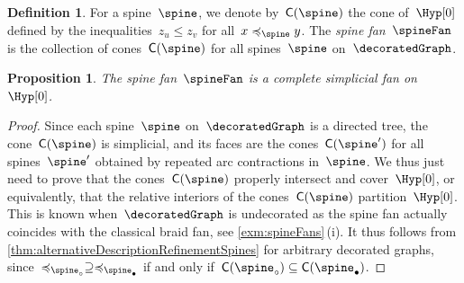 \documentclass{amsart}
\newtheorem{proposition}[theorem]{Proposition}
\theoremstyle{definition}
\newtheorem{definition}[theorem]{Definition}
\newtheorem{example}[theorem]{Example}
\newcommand{\R}{\mathbb{R}} %
\renewcommand{\b}[1]{{\boldsymbol{#1}}} %
\newcommand{\set}[2]{\left\{ #1 \;\middle|\; #2 \right\}} %
\newcommand{\darkblue}{\color{darkblue}} %
\newcommand{\defn}[1]{\textsl{\darkblue #1}} %
\newcommand{\vincent}[1]{\todo[color=blue!30]{#1 \\ \hfill --- V.}}
\newcommand{\normalCone}{\mathsf{C}} %
\begin{document}
%
%

\begin{definition}
  \label{def:spineFan}
  For a spine~$\spine$, we denote by~$\normalCone(\spine)$ the cone of~$\Hyp[0]$ defined by the inequalities~${z_u \le z_v}$ for all~$x \preccurlyeq_{\spine} y$.
  The \defn{spine fan}~$\spineFan$ is the collection of cones~$\normalCone(\spine)$ for all spines~$\spine$ on~$\decoratedGraph$.  
\end{definition}

\begin{proposition}
  \label{prop:spineFan}
  The spine fan~$\spineFan$ is a complete simplicial fan on~$\Hyp[0]$.
\end{proposition}

\begin{proof}
  Since each spine~$\spine$ on~$\decoratedGraph$ is a directed tree, the cone~$\normalCone(\spine)$ is simplicial, and its faces are the cones~$\normalCone(\spine')$ for all spines~$\spine'$ obtained by repeated arc contractions in~$\spine$. %
  We thus just need to prove that the cones~$\normalCone(\spine)$ properly intersect and cover~$\Hyp[0]$, or equivalently, that the relative interiors of the cones~$\normalCone(\spine)$ partition~$\Hyp[0]$.
  This is known when~$\decoratedGraph$ is undecorated as the spine fan actually coincides with the classical braid fan, see \cref{exm:spineFans}\,(i).
  It thus follows from \cref{thm:alternativeDescriptionRefinementSpines} for arbitrary decorated graphs, since~$\preccurlyeq_{\spine_\circ} \supseteq \preccurlyeq_{\spine_\bullet}$ if and only if~$\normalCone(\spine_\circ) \subseteq \normalCone(\spine_\bullet)$.
\end{proof}
\end{document}
